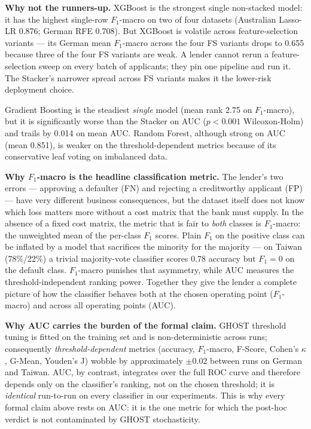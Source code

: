 \textbf{Why not the runners-up.}  XGBoost is the strongest single
non-stacked model: it has the highest single-row $F_1$-macro on
two of four datasets (Australian Lasso-LR 0.876; German RFE 0.708).
But XGBoost is volatile across feature-selection variants ---
its German mean $F_1$-macro across the four FS variants drops to
0.655 because three of the four FS variants are weak.  A lender
cannot rerun a feature-selection sweep on every batch of
applicants; they pin one pipeline and run it.  The Stacker's
narrower spread across FS variants makes it the lower-risk
deployment choice.

Gradient Boosting is the steadiest \emph{single} model (mean rank
2.75 on $F_1$-macro), but it is significantly worse than the
Stacker on AUC ($p<0.001$ Wilcoxon-Holm) and trails by 0.014 on
mean AUC.  Random Forest, although strong on AUC (mean 0.851), is
weaker on the threshold-dependent metrics because of its
conservative leaf voting on imbalanced data.

\textbf{Why $F_1$-macro is the headline classification metric.}
The lender's two errors --- approving a defaulter (FN) and
rejecting a creditworthy applicant (FP) --- have very different
business consequences, but the dataset itself does not know which
loss matters more without a cost matrix that the bank must supply.
In the absence of a fixed cost matrix, the metric that is fair to
\emph{both} classes is $F_1$-macro: the unweighted mean of the
per-class $F_1$ scores.  Plain $F_1$ on the positive class can be
inflated by a model that sacrifices the minority for the majority
--- on Taiwan (78\%/22\%) a trivial majority-vote classifier
scores 0.78 accuracy but $F_1=0$ on the default class.
$F_1$-macro punishes that asymmetry, while AUC measures the
threshold-independent ranking power.  Together they give the
lender a complete picture of how the classifier behaves both at
the chosen operating point ($F_1$-macro) and across all operating
points (AUC).

\textbf{Why AUC carries the burden of the formal claim.}  GHOST
threshold tuning is fitted on the training set and is
non-deterministic across runs; consequently
\emph{threshold-dependent} metrics (accuracy, $F_1$-macro, F-Score,
Cohen's $\kappa$, G-Mean, Youden's J) wobble by approximately
$\pm 0.02$ between runs on German and Taiwan.  AUC, by contrast,
integrates over the full ROC curve and therefore depends only on
the classifier's ranking, not on the chosen threshold; it is
\emph{identical} run-to-run on every classifier in our
experiments.  This is why every formal claim
above rests on AUC: it is the one metric for which the post-hoc
verdict is not contaminated by GHOST stochasticity.


